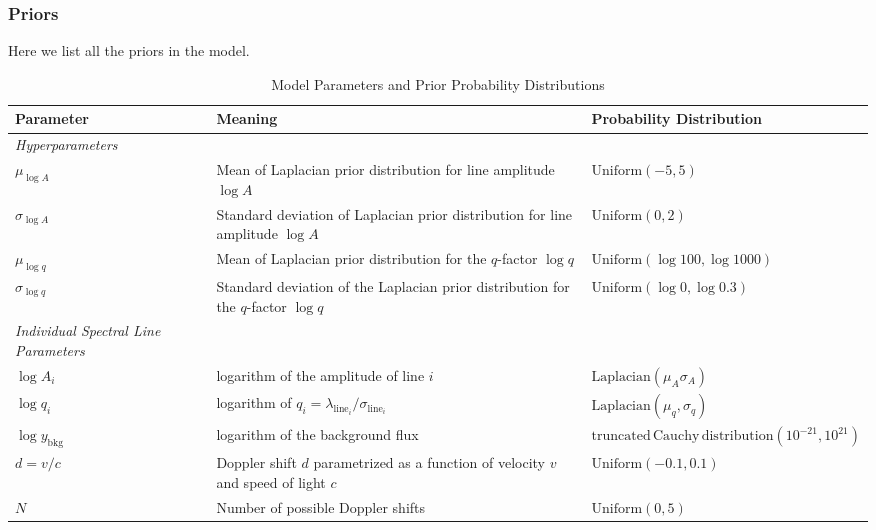 \documentclass[12pt]{emulateapj}
\newcommand{\counts}{y}
\begin{document}
\subsubsection{Priors}

Here we list all the priors in the model.


\begin{table*}[hbtp]
\renewcommand{\arraystretch}{1.3}
\footnotesize
\caption{Model Parameters and Prior Probability Distributions}
\begin{threeparttable} 
\begin{tabularx}{\textwidth}{p{4.0cm}p{7.0cm}X}%
\toprule
\bf{Parameter} & \bf{Meaning} & \bf{Probability Distribution} \\ \midrule
\it{Hyperparameters} && \\ \midrule
$\mu_{\log{A}}$ & Mean of Laplacian prior distribution for line amplitude $\log{A}$ &  $\mathrm{Uniform}(-5, 5)$  \\
$\sigma_{\log{A}}$ & Standard deviation of Laplacian prior distribution for line amplitude $\log{A}$ & $\mathrm{Uniform}(0,2)$ \\
$\mu_{\log{q}}$ & Mean of Laplacian prior distribution for the $q$-factor $\log{q}$ & $\mathrm{Uniform}(\log{100}, \log{1000})$  \\
$\sigma_{\log{q}}$ & Standard deviation of the Laplacian prior distribution for the $q$-factor $\log{q}$ & $\mathrm{Uniform}(\log{0}, \log{0.3})$\\ 
\midrule
\it{Individual Spectral Line Parameters} && \\ \midrule
$\log{A_i}$ & logarithm of the amplitude of line $i$ & $\mathrm{Laplacian}(\mu_A \sigma_A)$ \\
$\log{q_i}$ & logarithm of $q_i = \lambda_{\mathrm{line}_{i}}/\sigma_{\mathrm{line}_{i}}$ & $\mathrm{Laplacian}(\mu_q, \sigma_q)$ \\
$\log{\counts}_{\mathrm{bkg}}$ & logarithm of the background flux & $\mathrm{truncated\, Cauchy\, distribution}(10^{-21}, 10^{21})$ \\
$d = v/c$ & Doppler shift $d$ parametrized as a function of velocity $v$ and speed of light $c$ & $\mathrm{Uniform}(-0.1, 0.1)$ \\
$N$ & Number of possible Doppler shifts & $\mathrm{Uniform}(0,5)$  \\\bottomrule

\end{tabularx}
\end{threeparttable}
\end{table*}
\end{document}
